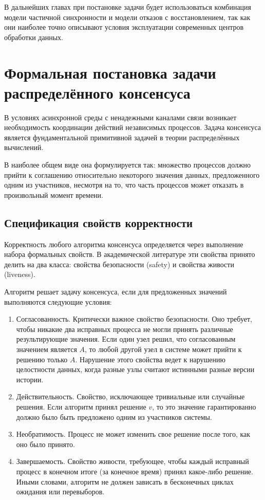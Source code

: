 В дальнейших главах при постановке задачи будет использоваться комбинация модели частичной синхронности и модели отказов с восстановлением, так как они наиболее точно описывают условия эксплуатации современных центров обработки данных.

\section{Формальная постановка задачи распределённого консенсуса}

В условиях асинхронной среды с ненадежными каналами связи возникает необходимость координации действий независимых процессов. Задача консенсуса является фундаментальной примитивной задачей в теории распределённых вычислений.

В наиболее общем виде она формулируется так: множество процессов должно прийти к соглашению относительно некоторого значения данных, предложенного одним из участников, несмотря на то, что часть процессов может отказать в произвольный момент времени.

\subsection{Спецификация свойств корректности}

Корректность любого алгоритма консенсуса определяется через выполнение набора формальных свойств. В академической литературе эти свойства принято делить на два класса: свойства безопасности (safety) и свойства живости (liveness).

Алгоритм решает задачу консенсуса, если для предложенных значений выполняются следующие условия:

\begin{enumerate}
    \item Согласованность.
    Критически важное свойство безопасности. Оно требует, чтобы никакие два исправных процесса не могли принять различные результирующие значения. Если один узел решил, что согласованным значением является $A$, то любой другой узел в системе может прийти к решению только $A$.
    Нарушение этого свойства ведет к нарушению целостности данных, когда разные узлы считают истинными разные версии истории.

    \item Действительность.
    Свойство, исключающее тривиальные или случайные решения. Если алгоритм принял решение $v$, то это значение гарантированно должно было быть предложено одним из участников системы.

    \item Необратимость.
    Процесс не может изменить свое решение после того, как оно было принято.

    \item Завершаемость.
    Свойство живости, требующее, чтобы каждый исправный процесс в конечном итоге (за конечное время) принял какое-либо решение. Иными словами, алгоритм не должен зависать в бесконечных циклах ожидания или перевыборов.
\end{enumerate}

